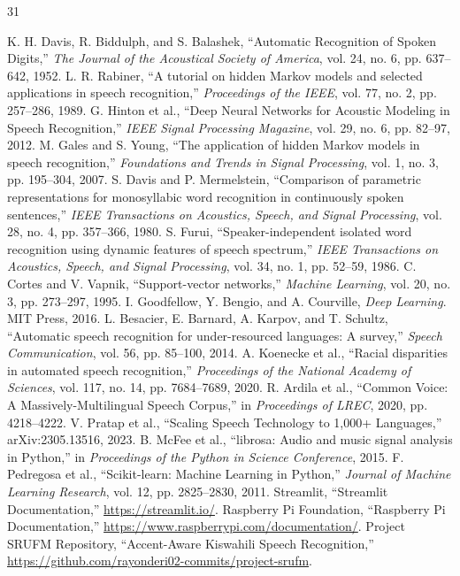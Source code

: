 \documentclass[12pt,a4paper]{report}
\begin{document}
\begin{thebibliography}{31}
 K. H. Davis, R. Biddulph, and S. Balashek, ``Automatic Recognition of Spoken Digits,'' \textit{The Journal of the Acoustical Society of America}, vol. 24, no. 6, pp. 637--642, 1952.
 L. R. Rabiner, ``A tutorial on hidden Markov models and selected applications in speech recognition,'' \textit{Proceedings of the IEEE}, vol. 77, no. 2, pp. 257--286, 1989.
 G. Hinton et al., ``Deep Neural Networks for Acoustic Modeling in Speech Recognition,'' \textit{IEEE Signal Processing Magazine}, vol. 29, no. 6, pp. 82--97, 2012.
 M. Gales and S. Young, ``The application of hidden Markov models in speech recognition,'' \textit{Foundations and Trends in Signal Processing}, vol. 1, no. 3, pp. 195--304, 2007.
 S. Davis and P. Mermelstein, ``Comparison of parametric representations for monosyllabic word recognition in continuously spoken sentences,'' \textit{IEEE Transactions on Acoustics, Speech, and Signal Processing}, vol. 28, no. 4, pp. 357--366, 1980.
 S. Furui, ``Speaker-independent isolated word recognition using dynamic features of speech spectrum,'' \textit{IEEE Transactions on Acoustics, Speech, and Signal Processing}, vol. 34, no. 1, pp. 52--59, 1986.
 C. Cortes and V. Vapnik, ``Support-vector networks,'' \textit{Machine Learning}, vol. 20, no. 3, pp. 273--297, 1995.
 I. Goodfellow, Y. Bengio, and A. Courville, \textit{Deep Learning}. MIT Press, 2016.
 L. Besacier, E. Barnard, A. Karpov, and T. Schultz, ``Automatic speech recognition for under-resourced languages: A survey,'' \textit{Speech Communication}, vol. 56, pp. 85--100, 2014.
 A. Koenecke et al., ``Racial disparities in automated speech recognition,'' \textit{Proceedings of the National Academy of Sciences}, vol. 117, no. 14, pp. 7684--7689, 2020.
 R. Ardila et al., ``Common Voice: A Massively-Multilingual Speech Corpus,'' in \textit{Proceedings of LREC}, 2020, pp. 4218--4222.
 V. Pratap et al., ``Scaling Speech Technology to 1,000+ Languages,'' arXiv:2305.13516, 2023.
 B. McFee et al., ``librosa: Audio and music signal analysis in Python,'' in \textit{Proceedings of the Python in Science Conference}, 2015.
 F. Pedregosa et al., ``Scikit-learn: Machine Learning in Python,'' \textit{Journal of Machine Learning Research}, vol. 12, pp. 2825--2830, 2011.
 Streamlit, ``Streamlit Documentation,'' \url{https://streamlit.io/}.
 Raspberry Pi Foundation, ``Raspberry Pi Documentation,'' \url{https://www.raspberrypi.com/documentation/}.
 Project SRUFM Repository, ``Accent-Aware Kiswahili Speech Recognition,'' \url{https://github.com/rayonderi02-commits/project-srufm}.
\end{thebibliography}
\end{document}
